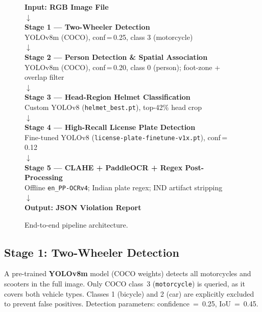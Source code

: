 \documentclass[12pt,a4paper]{article}
\begin{document}
\begin{figure}[h]
\centering
\begin{tcolorbox}[colback=primaryblue!5!white, colframe=primaryblue, title=End-to-End Pipeline, width=\linewidth]
\centering\small
\textbf{Input: RGB Image File}\\[0.4em]
$\downarrow$\\[0.2em]
\textbf{Stage 1 — Two-Wheeler Detection}\\
\small YOLOv8m (COCO), conf\,=\,0.25, class 3 (motorcycle)\\[0.2em]
$\downarrow$\\[0.2em]
\textbf{Stage 2 — Person Detection \& Spatial Association}\\
\small YOLOv8m (COCO), conf\,=\,0.20, class 0 (person); foot-zone + overlap filter\\[0.2em]
$\downarrow$\\[0.2em]
\textbf{Stage 3 — Head-Region Helmet Classification}\\
\small Custom YOLOv8 (\texttt{helmet\_best.pt}), top-42\% head crop\\[0.2em]
$\downarrow$\\[0.2em]
\textbf{Stage 4 — High-Recall License Plate Detection}\\
\small Fine-tuned YOLOv8 (\texttt{license-plate-finetune-v1x.pt}), conf\,=\,0.12\\[0.2em]
$\downarrow$\\[0.2em]
\textbf{Stage 5 — CLAHE + PaddleOCR + Regex Post-Processing}\\
\small Offline \texttt{en\_PP-OCRv4}; Indian plate regex; IND artifact stripping\\[0.4em]
$\downarrow$\\[0.2em]
\textbf{Output: JSON Violation Report}
\end{tcolorbox}
\caption{End-to-end pipeline architecture.}
\label{fig:arch}
\end{figure}

\subsection{Stage 1: Two-Wheeler Detection}

A pre-trained \textbf{YOLOv8m} model (COCO weights) detects all motorcycles and scooters
in the full image. Only COCO class~3 (\texttt{motorcycle}) is queried, as it covers both
vehicle types. Classes 1 (bicycle) and 2 (car) are explicitly excluded to prevent false
positives. Detection parameters: confidence~=~0.25, IoU~=~0.45.
\end{document}
